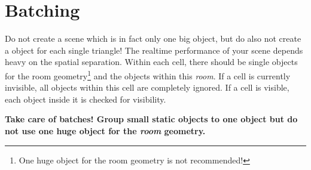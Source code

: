 \chapter{Batching}
Do not create a scene which is in fact only one big object, but do also not create a object for each single triangle! The realtime performance of your scene depends heavy on the spatial separation. Within each cell, there should be single objects for the room geometry\footnote{One huge object for the room geometry is not recommended!} and the objects within this \emph{room}. If a cell is currently invisible, all objects within this cell are completely ignored. If a cell is visible, each object inside it is checked for visibility.

\textbf{Take care of batches! Group small static objects to one object but do not use one huge object for the \emph{room} geometry.}
